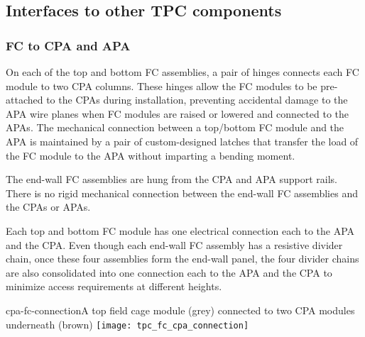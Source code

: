 
\subsection{Interfaces to other TPC components}

\subsubsection{FC to CPA and APA}

On each of the top and bottom FC assemblies, a pair of hinges connects each FC module to two CPA columns. These hinges allow the FC modules to be pre-attached to the CPAs during installation, preventing accidental damage to the APA wire planes when FC modules are raised or lowered and connected to the APAs.  The mechanical connection between a top/bottom FC module and the APA is maintained by a pair of custom-designed latches that transfer the load of the FC module to the APA without imparting a bending moment.

The end-wall FC assemblies are hung from the CPA and APA support rails.  There is no rigid mechanical connection 
between the end-wall FC assemblies and the CPAs or APAs. 

Each top and bottom FC module has one electrical connection each to the APA and the CPA. Even though each end-wall FC assembly has a resistive divider chain, once these four assemblies form the end-wall panel, the four divider chains are also consolidated into one connection each to the APA and the CPA to minimize  access requirements at different heights. 

\begin{cdrfigure}{cpa-fc-connection}{A top field cage module (grey) connected to two CPA modules underneath (brown)}
\texttt{[image: tpc\_fc\_cpa\_connection]}
\end{cdrfigure}

